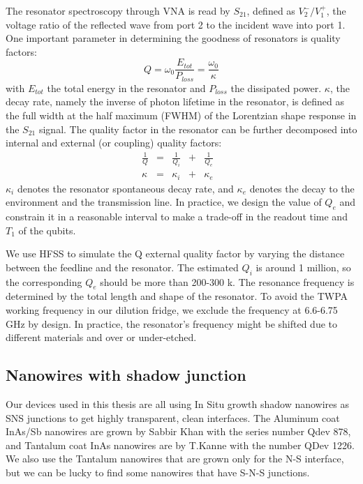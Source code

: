 The resonator spectroscopy through VNA is read by $S_{21}$, defined as $V_2^-/V_1^+$, the voltage ratio of the reflected wave from port 2 to the incident wave into port 1. One important parameter in determining the goodness of resonators is quality factors\cite{RN65}:
\begin{equation}
    Q = \omega_0\frac{E_{tot}}{P_{loss}} = \frac{\omega_0}{\kappa}
\end{equation}
with $E_{tot}$ the total energy in the resonator and $P_{loss}$ the dissipated power. $\kappa$, the decay rate, namely the inverse of photon lifetime in the resonator, is defined as the full width at the half maximum (FWHM) of the Lorentzian shape response in the $S_{21}$ signal. The quality factor in the resonator can be further decomposed into internal and external (or coupling) quality factors:
\begin{equation}
\begin{array}{lrlrll}
     \frac{1}{Q}& =& \frac{1}{Q_i}& +& \frac{1}{Q_e}&  \\
     \kappa& =& \kappa_i& +& \kappa_e&
\end{array}
\end{equation}
$\kappa_i$ denotes the resonator spontaneous decay rate, and $\kappa_e$ denotes the decay to the environment and the transmission line. In practice, we design the value of $Q_e$ and constrain it in a reasonable interval to make a trade-off in the readout time and $T_1$ of the qubits.

We use HFSS to simulate the Q external quality factor by varying the distance between the feedline and the resonator. The estimated $Q_i$ is around 1 million, so the corresponding $Q_e$ should be more than 200-300 k. The resonance frequency is determined by the total length and shape of the resonator. To avoid the TWPA working frequency in our dilution fridge, we exclude the frequency at 6.6-6.75 GHz by design. In practice, the resonator's frequency might be shifted due to different materials and over or under-etched.

\subsection{Nanowires with shadow junction}

Our devices used in this thesis are all using In Situ growth shadow nanowires as SNS junctions to get highly transparent, clean interfaces. The Aluminum coat InAs/Sb nanowires are grown by Sabbir Khan with the series number Qdev 878\cite{RN38}, and Tantalum coat InAs nanowires are by T.Kanne with the number QDev 1226. We also use the Tantalum nanowires\cite{RN37} that are grown only for the N-S interface, but we can be lucky to find some nanowires that have S-N-S junctions.

